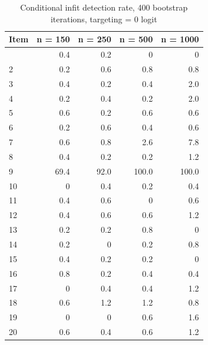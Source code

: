 \documentclass[
  letterpaper,
  DIV=11,
  numbers=noendperiod]{scrartcl}
\begin{document}
\begin{longtable}[]{@{}lrrrr@{}}

\caption{\label{tbl-ifbresults4000}Conditional infit detection rate, 400
bootstrap iterations, targeting = 0 logit}

\tabularnewline

\toprule\noalign{}
Item & n = 150 & n = 250 & n = 500 & n = 1000 \\
\midrule\noalign{}
\endhead
\bottomrule\noalign{}
\endlastfoot
1 & 0.4 & 0.2 & 0 & 0 \\
2 & 0.2 & 0.6 & 0.8 & 0.8 \\
3 & 0.4 & 0.2 & 0.4 & 2.0 \\
4 & 0.2 & 0.4 & 0.2 & 2.0 \\
5 & 0.6 & 0.2 & 0.6 & 0.6 \\
6 & 0.2 & 0.6 & 0.4 & 0.6 \\
7 & 0.6 & 0.8 & 2.6 & 7.8 \\
8 & 0.4 & 0.2 & 0.2 & 1.2 \\
9 & 69.4 & 92.0 & 100.0 & 100.0 \\
10 & 0 & 0.4 & 0.2 & 0.4 \\
11 & 0.4 & 0.6 & 0 & 0.6 \\
12 & 0.4 & 0.6 & 0.6 & 1.2 \\
13 & 0.2 & 0.2 & 0.8 & 0 \\
14 & 0.2 & 0 & 0.2 & 0.8 \\
15 & 0.4 & 0.2 & 0.2 & 0 \\
16 & 0.8 & 0.2 & 0.4 & 0.4 \\
17 & 0 & 0.4 & 0.4 & 1.2 \\
18 & 0.6 & 1.2 & 1.2 & 0.8 \\
19 & 0 & 0 & 0.6 & 1.6 \\
20 & 0.6 & 0.4 & 0.6 & 1.2 \\

\end{longtable}
\end{document}
